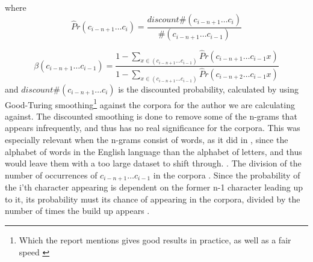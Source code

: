 where 
$$
\hat{P}r(c_{i - n + 1} \ldots c_{i}) = \frac{discount \#(c_{i - n + 1} \ldots c_{i})}{\#(c_{i - n + 1} \ldots c_{i-1})}
$$

$$
\beta(c_{i - n + 1} \ldots c_{i-1}) = 
\frac
{1 - \sum_{x \in (c_{i - n + 1} \ldots c_{i-1})}\hat{P}r(c_{i - n + 1} \ldots c_{i-1} x)}
{1 - \sum_{x \in (c_{i - n + 1} \ldots c_{i-1})}\hat{P}r(c_{i - n + 2} \ldots c_{i-1} x)}
$$
and 
$discount\#(c_{i - n + 1} \ldots c_{i})$ 
is the discounted probability, calculated by using Good-Turing smoothing\footnote{Which the report mentions gives good results in practice, as well as a fair speed \cite{nr4}} against the corpora for the author we are calculating against. The discounted smoothing is done to remove some of the n-grams that appears infrequently, and thus has no real significance for the corpora. This was especially relevant when the n-grams consist of words, as it did in \cite{nr4}, since the alphabet of words in the English language than the alphabet of letters, and thus would leave them with a too large dataset to shift through. . The division of the number of occurrences of $c_{i - n + 1} \ldots c_{i - 1}$ in the corpora . Since the probability of the i'th character appearing is dependent on the former n-1 character leading up to it, its probability must its chance of appearing in the corpora, divided by the number of times the build up appears .  

